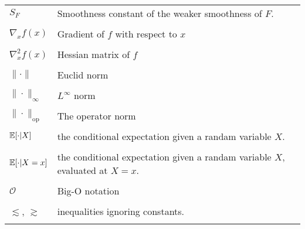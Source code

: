\begin{longtable}{|>{\raggedright\arraybackslash}p{3cm}|>{\raggedright\arraybackslash}p{9cm}|}
$S_F$ & Smoothness constant of the weaker smoothness of $F$. \\ & \\


$\nabla_x f(x)$ & Gradient of $f$ with respect to $x$ \\ & \\ %
$\nabla_x^2 f(x)$ & Hessian matrix of $f$ \\ & \\ %
$\|\cdot\|$ & Euclid norm \\ & \\
$\|\cdot\|_\infty$ & $L^\infty$ norm \\ & \\
$\|\cdot\|_{\mathrm{op}}$ & The operator norm \\ & \\

$\mathbb{E}[\cdot|X]$ & the conditional expectation given a randam variable $X$. \\ & \\

$\mathbb{E}[\cdot|X=x]$ & the conditional expectation given a randam variable $X$, evaluated at $X=x$.\\ & \\

$\mathcal{O}$ & Big-O notation \\ & \\
$\lesssim$, $\gtrsim$ & inequalities ignoring constants. \\ & \\


\hline

\end{longtable}